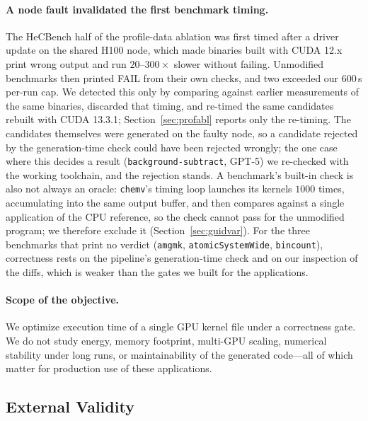 \paragraph{A node fault invalidated the first benchmark timing.}
The HeCBench half of the profile-data ablation was first timed after a driver update on the shared
H100 node, which made binaries built with CUDA 12.x print wrong output and run $20$--$300\times$
slower without failing. Unmodified benchmarks then printed FAIL from their own checks, and two
exceeded our $600$\,s per-run cap. We detected this only by comparing against earlier measurements of
the same binaries, discarded that timing, and re-timed the same candidates rebuilt with CUDA 13.3.1;
Section~\ref{sec:profabl} reports only the re-timing. The candidates themselves were generated on the
faulty node, so a candidate rejected by the generation-time check could have been rejected wrongly; the
one case where this decides a result (\texttt{background-subtract}, GPT-5) we re-checked with the
working toolchain, and the rejection stands. A benchmark's built-in check is also not always an oracle:
\texttt{chemv}'s timing loop launches its kernels $1000$ times, accumulating into the same output
buffer, and then compares against a single application of the CPU reference, so the check cannot pass
for the unmodified program; we therefore exclude it (Section~\ref{sec:guidvar}). For the three
benchmarks that print no verdict (\texttt{amgmk}, \texttt{atomicSystemWide}, \texttt{bincount}),
correctness rests on the pipeline's generation-time check and on our inspection of the diffs, which is
weaker than the gates we built for the applications.

\paragraph{Scope of the objective.}
We optimize execution time of a single GPU kernel file under a correctness gate. We do not study
energy, memory footprint, multi-GPU scaling, numerical stability under long runs, or maintainability of
the generated code---all of which matter for production use of these applications.

\subsection{External Validity}
